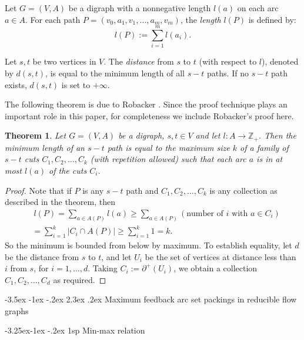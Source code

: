 \documentclass[11pt]{article}
\makeatletter
\newtheorem{theorem}{Theorem}[section]
\renewcommand\section{%
  \@startsection{section}{1}
                {\z@}%
                {-3.5ex \@plus -1ex \@minus -.2ex}%
                {2.3ex \@plus.2ex}%
                {\large\bfseries}%
}
\renewcommand\subsection{%
  \@startsection{subsection}{2}
                {\z@}%
                {-3.25ex\@plus -1ex \@minus -.2ex}%
                {1sp}%
                {\normalsize\bfseries}%
}
\makeatother
\begin{document}
Let $G=(V,A)$ be a digraph with a nonnegative length $l(a)$ on each arc $a\in A$. For each path $P=(v_0,a_1,v_1,\dots,a_m,v_m)$, the \emph{length} $l(P)$ is defined by:
\begin{equation*}
l(P):=\sum_{i=1}^m l(a_i).
\end{equation*}

Let $s,t$ be two vertices in $V$. The \emph{distance} from $s$ to $t$ (with respect to $l$), denoted by $d(s,t)$, is equal to the minimum length of all $s-t$ paths. If no $s-t$ path exists, $d(s,t)$ is set to $+\infty$.

The following theorem is due to Robacker \cite{Roba}. Since the proof technique plays an important role in this paper, for completeness we include Robacker's proof here.
\begin{theorem}
\label{thm:3}
Let $G=(V,A)$ be a digraph, $s,t\in V$ and let $l:A\rightarrow \mathbb{Z}_+$. Then the minimum length of an $s-t$ path is equal to the maximum size $k$ of a family of $s-t$ cuts $C_1,C_2,\dots,C_k$ (with repetition allowed) such that each arc $a$ is in at most $l(a)$ of the cuts $C_i$.
\end{theorem}
\begin{proof}
Note that if $P$ is any $s-t$ path and $C_1,C_2,\dots,C_k$ is any collection as described in the theorem, then
\begin{equation*}
\begin{split}
&~ l(P)=\sum_{a\in A(P)}l(a)\geq \sum_{a\in A(P)}(\mbox{number of $i$ with $a\in C_i$})\\
&=\sum_{i=1}^k\lvert C_i\cap A(P)\rvert \geq \sum_{i=1}^k 1=k.
\end{split}
\end{equation*}
So the minimum is bounded from below by maximum. To establish equality, let $d$ be the distance from $s$ to $t$, and let $U_i$ be the set of vertices at distance less than $i$ from $s$, for $i=1,\dots,d$. Taking $C_i:=\partial^+(U_i)$, we obtain a collection $C_1,C_2,\dots,C_d$ as required.
\end{proof}


\section{Maximum feedback arc set packings in reducible flow graphs}
\label{sec:3}

\subsection{Min-max relation}
\label{sec:4}
\end{document}
